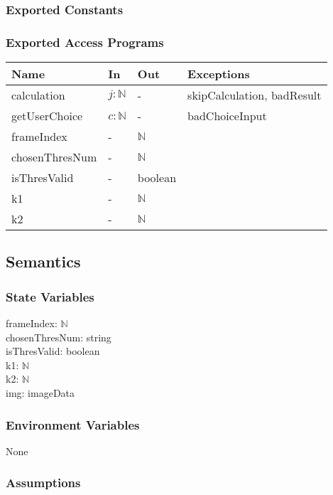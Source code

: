 \documentclass[12pt, titlepage]{article}
\begin{document}
\subsubsection{Exported Constants}

\subsubsection{Exported Access Programs}

\begin{center}
\begin{tabular}{p{4cm} p{2cm} p{2cm} p{6cm}}
\hline
\textbf{Name} & \textbf{In} & \textbf{Out} & \textbf{Exceptions} \\
\hline
calculation & $j: \mathbb{N}$ & - & skipCalculation, badResult\\
getUserChoice & $c: \mathbb{N}$ & - & badChoiceInput \\
frameIndex & - & $\mathbb{N}$ &  \\
chosenThresNum & - & $\mathbb{N}$ &  \\
isThresValid & - & boolean &\\
k1 & - & $\mathbb{N}$ &  \\
k2 & - & $\mathbb{N}$ &  \\
\hline
\end{tabular}
\end{center}

\subsection{Semantics}

\subsubsection{State Variables}

frameIndex: $\mathbb{N}$\\
chosenThresNum: string\\
isThresValid: boolean\\
k1: $\mathbb{N}$\\
k2: $\mathbb{N}$\\
img: imageData 

\subsubsection{Environment Variables}

None

\subsubsection{Assumptions}
\end{document}
